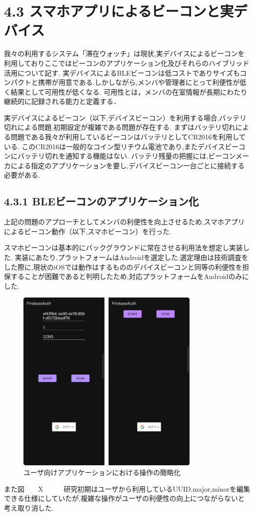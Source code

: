 \section*{4.3 スマホアプリによるビーコンと実デバイス}
 我々の利用するシステム「滞在ウォッチ」は現状,実デバイスによるビーコンを利用しておりここではビーコンのアプリケーション化及びそれらのハイブリッド活用について記す.
 実デバイスによるBLEビーコンは低コストでありサイズもコンパクトと携帯が用意である.しかしながら,メンバや管理者にとって利便性が低く結果として可用性が低くなる.
 可用性とは，メンバの在室情報が長期にわたり継続的に記録される能力と定義する．
 
 実デバイスによるビーコン（以下,デバイスビーコン）を利用する場合,バッテリ切れによる問題,初期設定が複雑である問題が存在する.
まずはバッテリ切れによる問題である我々が利用しているビーコンはバッテリとしてCR2016を利用している.
このCR2016は一般的なコイン型リチウム電池であり,またデバイスビーコンにバッテリ切れを通知する機能はない.
バッテリ残量の把握には,ビーコンメーカによる指定のアプリケーションを要し,デバイスビーコン一台ごとに接続する必要がある.







\subsection*{4.3.1 BLEビーコンのアプリケーション化}
上記の問題のアプローチとしてメンバの利便性を向上させるため,スマホアプリによるビーコン動作（以下,スマホビーコン）を行った.


スマホビーコンは基本的にバックグラウンドに常在させる利用法を想定し実装した.
実装にあたり,プラットフォームはAndroidを選定した.選定理由は技術調査をした際に,現状のiOSでは動作はするもののデバイスビーコンと同等の利便性を担保することが困難であると判明したため,対応プラットフォームをAndroidのみにした.


 \begin{figure}[tbh]
   \centering
   \includegraphics[width=9cm]{image/AppBeforeAfter.png}
   \caption{ユーザ向けアプリケーションにおける操作の簡略化}
   \label{multipleBPM}
 \end{figure}
また図　　X　　　研究初期はユーザから利用しているUUID,major,minorを編集できる仕様にしていたが,複雑な操作がユーザの利便性の向上につながらないと考え取り消した.

